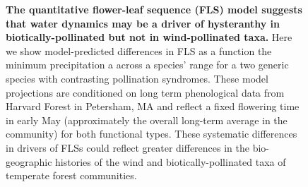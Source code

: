 \documentclass[11pt]{article}
\begin{document}
 \begin{figure}[h!] 
        \centering
           \caption{\textbf{The quantitative flower-leaf sequence (FLS) model suggests that water dynamics may be a driver of hysteranthy in biotically-pollinated but not in wind-pollinated taxa.} Here we show model-predicted differences in FLS as a function the minimum precipitation a across a species' range for a two generic species with contrasting pollination syndromes. These model projections are conditioned on long term phenological data from Harvard Forest in Petersham, MA \citep{OKeefe2015} and reflect a fixed flowering time in early May (approximately the overall long-term average in the community) for both functional types. These systematic differences in drivers of FLSs could reflect greater differences in the bio-geographic histories of the wind and biotically-pollinated taxa of temperate forest communities.}
        \label{fig:apcs}
    \end{figure}


    
\end{document}
